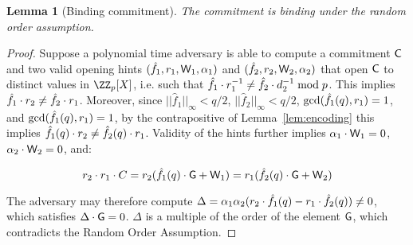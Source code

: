 \documentclass[11pt]{article}
\theoremstyle{Definition}
\newtheorem{lemma}{Lemma}
\begin{document}
\begin{lemma}[Binding commitment]
\label{lem:aug-com-binding}
	The commitment is binding under the random order assumption. 
\end{lemma}
\begin{proof}
	Suppose a polynomial time adversary is able to compute a commitment $\mathsf{C}$ and two valid opening hints $(\hat{f}_1, r_1, \mathsf{W}_1, \alpha_1)$ and $(\hat{f}_2, r_2, \mathsf{W}_2, \alpha_2)$ that open $\mathsf{C}$ to distinct values in $\ZZ_p[X]$, i.e. such that $\hat{f}_1 \cdot r_1^{-1} \neq \hat{f}_2 \cdot d_2^{-1} \bmod p$. 
	This implies $\hat{f}_1 \cdot r_2 \neq \hat{f}_2 \cdot r_1$. Moreover, since $||\hat{f}_1||_\infty < q/2$, $||\hat{f}_2||_\infty < q/2$, $\gcd(\hat{f}_1(q), r_1) = 1$, and $\gcd(\hat{f}_1(q), r_1) = 1$, by the contrapositive of Lemma~\ref{lem:encoding} this implies $\hat{f}_1(q) \cdot r_2 \neq \hat{f}_2(q) \cdot r_1$. Validity of the hints further implies $\alpha_1 \cdot \mathsf{W}_1 = 0$, $\alpha_2 \cdot \mathsf{W}_2 = 0$, and: 
	
	$$r_2 \cdot r_1 \cdot C = r_2 (\hat{f}_1(q) \cdot \mathsf{G} + \mathsf{W}_1) = r_1(\hat{f}_2(q) \cdot \mathsf{G} + \mathsf{W}_2)$$ 
	
	The adversary may therefore compute $\Delta = \alpha_1 \alpha_2 (r_2 \cdot \hat{f}_1(q)  - r_1 \cdot \hat{f}_2(q)) \neq 0$, which satisfies $\Delta \cdot \mathsf{G} = 0$. $\Delta$ is a multiple of the order of the element $\mathsf{G}$, which contradicts the Random Order Assumption. 
	 
	\end{proof}
	
\end{document}
